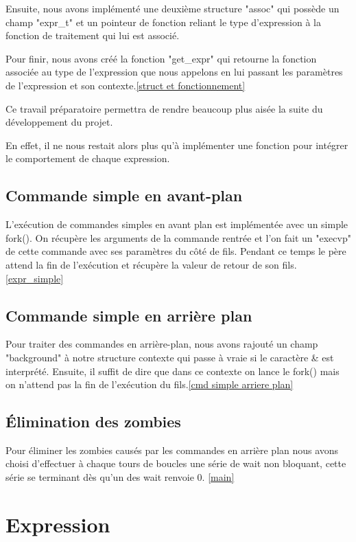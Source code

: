 \documentclass[12pt]{article}
\begin{document}
 Ensuite, nous avons implémenté une deuxième structure "assoc" qui possède un champ "expr\_t"
 et un pointeur de fonction reliant le type d'expression à la fonction de traitement
 qui lui est associé.
 
 Pour finir, nous avons créé la fonction "get\_expr" qui retourne la fonction associée au 
 type de l'expression que nous appelons en lui passant les paramètres de l'expression et son 
 contexte.\ref{struct et fonctionnement}
 
 Ce travail préparatoire permettra de rendre beaucoup plus aisée la suite du développement
 du projet.
 
 En effet, il ne nous restait alors plus qu'à implémenter une fonction pour intégrer le comportement
 de chaque expression.
 
 \subsection{Commande simple en avant-plan}
 
 L'exécution de commandes simples en avant plan est implémentée avec un simple fork().
 On récupère les arguments de la commande rentrée et l'on fait un "execvp" de cette commande
 avec ses paramètres du côté de fils. Pendant ce temps le père attend la fin de l'exécution
 et récupère la valeur de retour de son fils.\ref{expr_simple}
 
 \subsection{Commande simple en arrière plan}
 
 Pour traiter des commandes en arrière-plan, nous avons rajouté un champ "background"
à notre structure contexte qui passe à vraie si le caractère \& est interprété.
 Ensuite, il suffit de dire que dans ce contexte on lance le fork() mais on n’attend pas
la fin de l'exécution du fils.\ref{cmd simple arriere plan}
 
 
 \subsection{Élimination des zombies}

 Pour éliminer les zombies causés par les commandes en arrière plan nous avons choisi d'effectuer
 à chaque tours de boucles une série de wait non bloquant, cette série se terminant dès qu'un des
 wait renvoie 0. \ref{main}
 

\newpage
\section{Expression}
\end{document}
